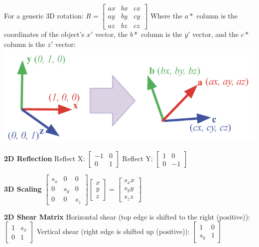 \documentclass[letterpaper, 8pt]{extarticle}
\begin{document}
\begin{multicols*}{4}
For a generic 3D rotation:
\(
R =
\begin{bmatrix}
    ax & bx & cx \\
    ay & by & cy \\
    az & bz & cz
\end{bmatrix}
\)
Where the \(a*\) column is the coordinates of the object's \(x'\) vector,
the \(b*\) column is the \(y'\) vector,
and the \(c*\) column is the \(z'\) vector:
\includegraphics[width=\linewidth]{3d-rotation.png}

\textbf{2D Reflection}
Reflect X:\@
\(
\begin{bmatrix} -1 & 0 \\ 0 & 1 \end{bmatrix}
\)
Reflect Y:\@
\(
\begin{bmatrix} 1 & 0 \\ 0 & -1 \end{bmatrix}
\)

\textbf{3D Scaling}
\(
\begin{bmatrix}
    s_x & 0   & 0   \\
    0   & s_y & 0   \\
    0   & 0   & s_z
\end{bmatrix}
\begin{bmatrix}
    x \\ y \\ z
\end{bmatrix}
=
\begin{bmatrix}
    s_x x \\ s_y y \\ s_z z
\end{bmatrix}
\)

\textbf{2D Shear Matrix}
Horizontal shear (top edge is shifted to the right (positive)):
\(
\begin{bmatrix}
    1 & s_x \\
    0 & 1
\end{bmatrix}
\)
Vertical shear (right edge is shifted up (positive)):
\(
\begin{bmatrix}
    1   & 0 \\
    s_y & 1
\end{bmatrix}
\)


\end{multicols*}
\end{document}
